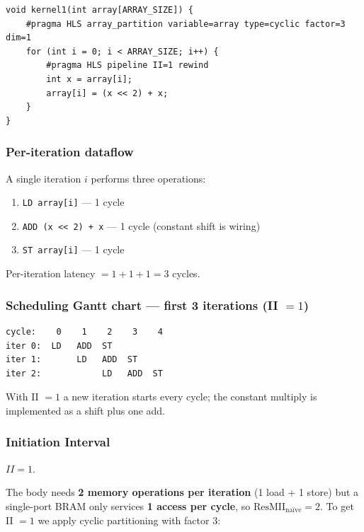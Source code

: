 \documentclass[11pt,a4paper]{article}
\begin{document}
\begin{lstlisting}
void kernel1(int array[ARRAY_SIZE]) {
    #pragma HLS array_partition variable=array type=cyclic factor=3 dim=1
    for (int i = 0; i < ARRAY_SIZE; i++) {
        #pragma HLS pipeline II=1 rewind
        int x = array[i];
        array[i] = (x << 2) + x;
    }
}
\end{lstlisting}

\subsubsection*{Per-iteration dataflow}

A single iteration $i$ performs three operations:
\begin{enumerate}[noitemsep]
  \item \texttt{LD array[i]} --- 1 cycle
  \item \texttt{ADD (x \textless\textless\ 2) + x} --- 1 cycle (constant shift is wiring)
  \item \texttt{ST array[i]} --- 1 cycle
\end{enumerate}

Per-iteration latency $= 1 + 1 + 1 = 3$ cycles.

\subsubsection*{Scheduling Gantt chart --- first 3 iterations (II $=1$)}

\begin{lstlisting}[style=schedule]
cycle:    0    1    2    3    4
iter 0:  LD   ADD  ST
iter 1:       LD   ADD  ST
iter 2:            LD   ADD  ST
\end{lstlisting}

With II $=1$ a new iteration starts every cycle; the constant multiply is implemented as a shift plus one add.

\subsubsection*{Initiation Interval}

$II = 1$.

The body needs \textbf{2 memory operations per iteration} (1 load + 1 store) but a single-port BRAM only services \textbf{1 access per cycle}, so $\mathrm{ResMII}_{\text{na\"ive}} = 2$. To get II $=1$ we apply cyclic partitioning with factor 3:
\end{document}
